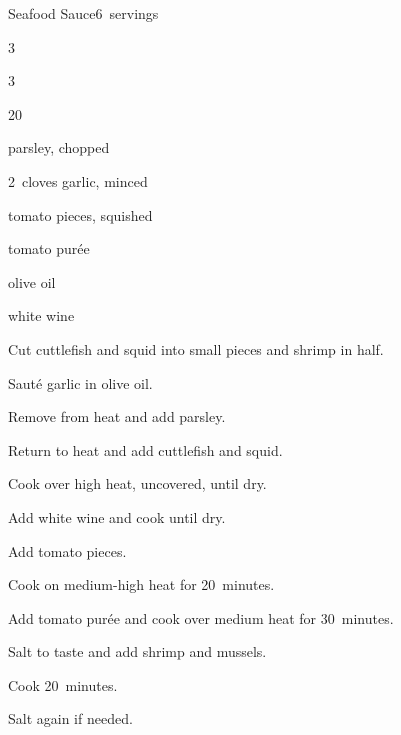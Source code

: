 \begin{recipe}{Seafood Sauce}{}{6~servings}

\begin{ingredients}
\item 3~
\item 3~
\item \lbs{\half} 
\item 20~
\item \C{\half} parsley, chopped
\item 2~cloves garlic, minced
\item {} tomato pieces, squished
\item {} tomato pur\'ee
\item \C{\half} olive oil
\item {} white wine
\end{ingredients}

\begin{directions}
\item Cut cuttlefish and squid into small pieces and shrimp in half.
\item Saut\'e garlic in olive oil.
\item Remove from heat and add parsley.
\item Return to heat and add cuttlefish and squid.
\item Cook over high heat, uncovered, until dry.
\item Add white wine and cook until dry.
\item Add tomato pieces.
\item Cook on medium-high heat for 20~minutes.
\item Add tomato pur\'ee and cook over medium heat for 30~minutes.
\item Salt to taste and add shrimp and mussels.
\item Cook 20~minutes.
\item Salt again if needed.
\end{directions}

\end{recipe}
